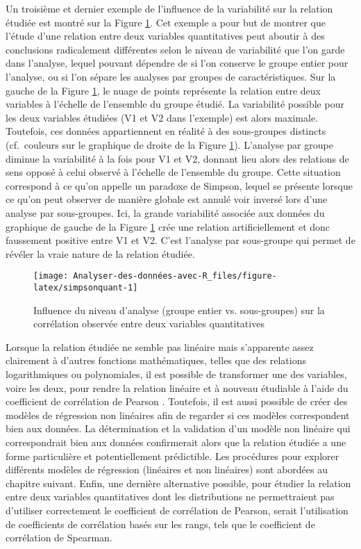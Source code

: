 \documentclass[
  french,
]{book}
\begin{document}
Un troisième et dernier exemple de l'influence de la variabilité sur la relation étudiée est montré sur la Figure \ref{fig:simpsonquant}. Cet exemple a pour but de montrer que l'étude d'une relation entre deux variables quantitatives peut aboutir à des conclusions radicalement différentes selon le niveau de variabilité que l'on garde dans l'analyse, lequel pouvant dépendre de si l'on conserve le groupe entier pour l'analyse, ou si l'on sépare les analyses par groupes de caractéristiques. Sur la gauche de la Figure \ref{fig:simpsonquant}, le nuage de points représente la relation entre deux variables à l'échelle de l'ensemble du groupe étudié. La variabilité possible pour les deux variables étudiées (V1 et V2 dans l'exemple) est alors maximale. Toutefois, ces données appartiennent en réalité à des sous-groupes distincts (cf.~couleurs sur le graphique de droite de la Figure \ref{fig:simpsonquant}). L'analyse par groupe diminue la variabilité à la fois pour V1 et V2, donnant lieu alors des relations de sens opposé à celui observé à l'échelle de l'ensemble du groupe. Cette situation correspond à ce qu'on appelle un paradoxe de Simpson, lequel se présente lorsque ce qu'on peut observer de manière globale est annulé voir inversé lors d'une analyse par sous-groupes. Ici, la grande variabilité associée aux données du graphique de gauche de la Figure \ref{fig:simpsonquant} crée une relation artificiellement et donc faussement positive entre V1 et V2. C'est l'analyse par sous-groupe qui permet de révéler la vraie nature de la relation étudiée.

\begin{figure}

{\centering \texttt{[image: Analyser-des-données-avec-R\_files/figure-latex/simpsonquant-1]} 

}

\caption{Influence du niveau d'analyse (groupe entier vs. sous-groupes) sur la corrélation observée entre deux variables quantitatives}\label{fig:simpsonquant}
\end{figure}

Lorsque la relation étudiée ne semble pas linéaire mais s'apparente assez clairement à d'autres fonctions mathématiques, telles que des relations logarithmiques ou polynomiales, il est possible de transformer une des variables, voire les deux, pour rendre la relation linéaire et à nouveau étudiable à l'aide du coefficient de corrélation de Pearson \autocite{halperinSpuriousCorrelationsCauses1986}. Toutefois, il est aussi possible de créer des modèles de régression non linéaires afin de regarder si ces modèles correspondent bien aux données. La détermination et la validation d'un modèle non linéaire qui correspondrait bien aux données confirmerait alors que la relation étudiée a une forme particulière et potentiellement prédictible. Les procédures pour explorer différents modèles de régression (linéaires et non linéaires) sont abordées au chapitre suivant. Enfin, une dernière alternative possible, pour étudier la relation entre deux variables quantitatives dont les distributions ne permettraient pas d'utiliser correctement le coefficient de corrélation de Pearson, serait l'utilisation de coefficients de corrélation basés sur les rangs, tels que le coefficient de corrélation de Spearman.
\end{document}

